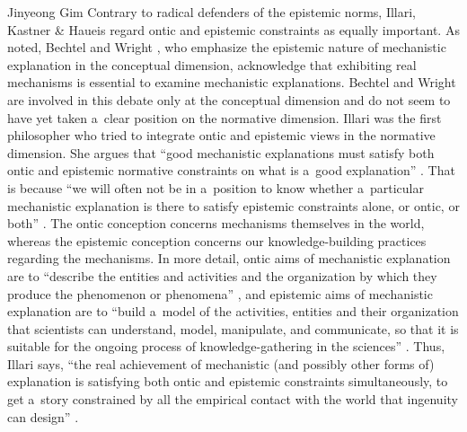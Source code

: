 \begin{artengenv}{Jinyeong Gim}
Contrary to radical defenders of the epistemic norms, Illari, Kastner \& Haueis regard ontic and epistemic constraints as equally important. As noted, Bechtel and Wright
\parencite*[][]{wright_mechanisms_2007}, %
 who emphasize the epistemic nature of mechanistic explanation in the conceptual dimension, acknowledge that exhibiting real mechanisms is essential to examine mechanistic explanations. Bechtel and Wright are involved in this debate only at the conceptual dimension and do not seem to have yet taken a~clear position on the normative dimension. Illari 
\parencite*[][]{illari_mechanistic_2013} %
 was the first philosopher who tried to integrate ontic and epistemic views in the normative dimension. She argues that ``good mechanistic explanations must satisfy both ontic and epistemic normative constraints on what is a~good explanation'' 
\parencite[][p.237]{illari_mechanistic_2013}. %
 That is because ``we will often not be in a~position to know whether a~particular mechanistic explanation is there to satisfy epistemic constraints alone, or ontic, or both'' 
\parencite[][p.254]{illari_mechanistic_2013}. %
 The ontic conception concerns mechanisms themselves in the world, whereas the epistemic conception concerns our knowledge-building practices regarding the mechanisms. In more detail, ontic aims of mechanistic explanation are to ``describe the entities and activities and the organization by which they produce the phenomenon or phenomena'' 
\parencite[][p.250]{illari_mechanistic_2013}, %
 and epistemic aims of mechanistic explanation are to ``build a~model of the activities, entities and their organization that scientists can understand, model, manipulate, and communicate, so that it is suitable for the ongoing process of knowledge-gathering in the sciences'' 
\parencite[][p.250]{illari_mechanistic_2013}. %
 Thus, Illari says, ``the real achievement of mechanistic (and possibly other forms of) explanation is satisfying both ontic and epistemic constraints simultaneously, to get a~story constrained by all the empirical contact with the world that ingenuity can design'' 
\parencite[][p.253]{illari_mechanistic_2013}.%



\end{artengenv}
